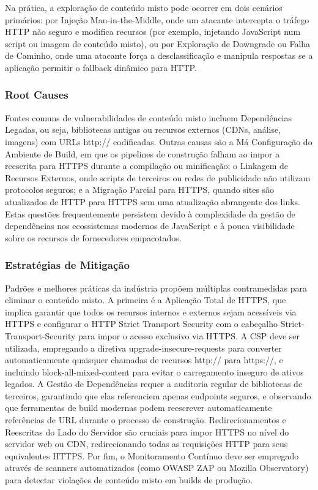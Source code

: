 Na prática, a exploração de conteúdo misto pode ocorrer em dois cenários primários: por Injeção Man-in-the-Middle, onde um atacante intercepta o tráfego HTTP não seguro e modifica recursos (por exemplo, injetando JavaScript num script ou imagem de conteúdo misto), ou por Exploração de Downgrade ou Falha de Caminho, onde uma atacante força a desclassificação e manipula respostas se a aplicação permitir o fallback dinâmico para HTTP. 

\subsubsection{Root Causes}
\label{subsubsec:root-cause-MC}

Fontes comuns de vulnerabilidades de conteúdo misto incluem Dependências Legadas, ou seja, bibliotecas antigas ou recursos externos (CDNs, análise, imagens) com URLs http:// codificadas. Outras causas são a Má Configuração do Ambiente de Build, em que os pipelines de construção falham ao impor a reescrita para HTTPS durante a compilação ou minificação; o Linkagem de Recursos Externos, onde scripts de terceiros ou redes de publicidade não utilizam protocolos seguros; e a Migração Parcial para HTTPS, quando sites são atualizados de HTTP para HTTPS sem uma atualização abrangente dos links. Estas questões frequentemente persistem devido à complexidade da gestão de dependências nos ecossistemas modernos de JavaScript e à pouca visibilidade sobre os recursos de fornecedores empacotados. \cite{ref49}

\subsubsection{Estratégias de Mitigação}
\label{subsubsec:mitigacao-MC}

Padrões e melhores práticas da indústria propõem múltiplas contramedidas para eliminar o conteúdo misto. A primeira é a Aplicação Total de HTTPS, que implica garantir que todos os recursos internos e externos sejam acessíveis via HTTPS e configurar o HTTP Strict Transport Security com o cabeçalho Strict-Transport-Security para impor o acesso exclusivo via HTTPS. A CSP deve ser utilizada, empregando a diretiva upgrade-insecure-requests para converter automaticamente quaisquer chamadas de recursos http:// para https://, e incluindo block-all-mixed-content para evitar o carregamento inseguro de ativos legados. A Gestão de Dependências requer a auditoria regular de bibliotecas de terceiros, garantindo que elas referenciem apenas endpoints seguros, e observando que ferramentas de build modernas podem reescrever automaticamente referências de URL durante o processo de construção. Redirecionamentos e Reescritas do Lado do Servidor são cruciais para impor HTTPS no nível do servidor web ou CDN, redirecionando todas as requisições HTTP para seus equivalentes HTTPS. Por fim, o Monitoramento Contínuo deve ser empregado através de scanners automatizados (como OWASP ZAP ou Mozilla Observatory) para detectar violações de conteúdo misto em builds de produção. \cite{ref52}


